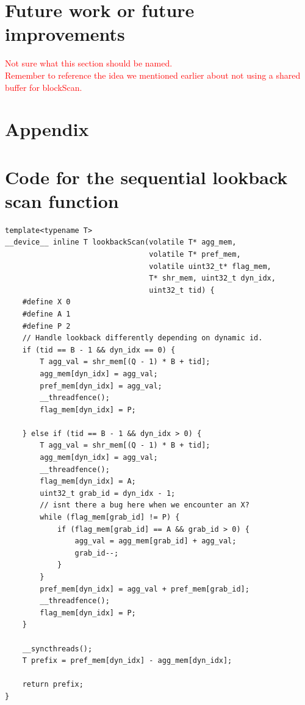 \documentclass[twocolumn]{article}
\newcommand{\note}[1]{\textcolor{red}{#1}\\}
\begin{document}
\section{Future work or future improvements}
\note{Not sure what this section should be named.}
\note{Remember to reference the idea we mentioned earlier about not using a shared buffer for blockScan.}

\onecolumn

\newpage


\section{Appendix}

\appendix

\section{Code for the sequential lookback scan function}
\begin{lstlisting}[caption=Lookback kernel,label=let:seqLookbackScan]
template<typename T>
__device__ inline T lookbackScan(volatile T* agg_mem,
                                 volatile T* pref_mem,
                                 volatile uint32_t* flag_mem,
                                 T* shr_mem, uint32_t dyn_idx,
                                 uint32_t tid) {
    #define X 0
    #define A 1
    #define P 2
	// Handle lookback differently depending on dynamic id.
    if (tid == B - 1 && dyn_idx == 0) {
		T agg_val = shr_mem[(Q - 1) * B + tid];
		agg_mem[dyn_idx] = agg_val;
        pref_mem[dyn_idx] = agg_val;
        __threadfence();
        flag_mem[dyn_idx] = P;

    } else if (tid == B - 1 && dyn_idx > 0) {
		T agg_val = shr_mem[(Q - 1) * B + tid];
        agg_mem[dyn_idx] = agg_val;
        __threadfence();
        flag_mem[dyn_idx] = A;
        uint32_t grab_id = dyn_idx - 1;
        // isnt there a bug here when we encounter an X?
        while (flag_mem[grab_id] != P) {
            if (flag_mem[grab_id] == A && grab_id > 0) {
                agg_val = agg_mem[grab_id] + agg_val;
                grab_id--;
            }
        }
		pref_mem[dyn_idx] = agg_val + pref_mem[grab_id];
        __threadfence();
        flag_mem[dyn_idx] = P;
    }

	__syncthreads();
	T prefix = pref_mem[dyn_idx] - agg_mem[dyn_idx];

    return prefix;
}
\end{lstlisting}
\end{document}
